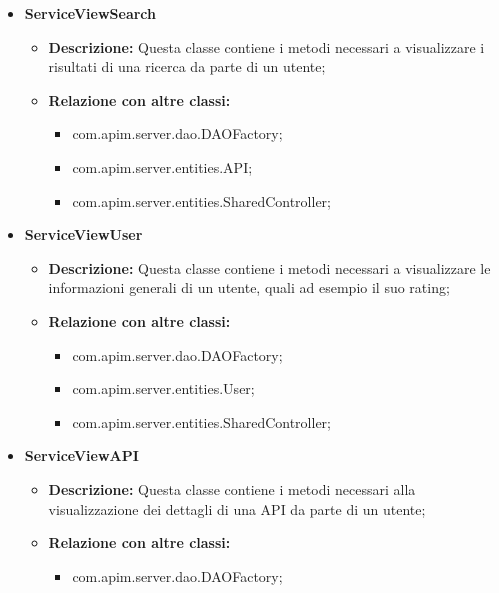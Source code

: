 {{{{\begin{itemize}
\begin{itemize}
\begin{itemize}
              \item com.apim.server.entities.SharedController;
            \end{itemize}
          \end{itemize}
          \item \textbf{ServiceViewSearch}
          \begin{itemize}
            \item \textbf{Descrizione:} Questa classe contiene i metodi necessari a visualizzare i risultati di una ricerca da parte di un utente;
            \item \textbf{Relazione con altre classi:}
            \begin{itemize}
              \item com.apim.server.dao.DAOFactory;
              \item com.apim.server.entities.API;
              \item com.apim.server.entities.SharedController;
            \end{itemize}
          \end{itemize}
          \item \textbf{ServiceViewUser}
          \begin{itemize}
            \item \textbf{Descrizione:} Questa classe contiene i metodi necessari a visualizzare le informazioni generali di un utente, quali ad esempio il suo rating;
            \item \textbf{Relazione con altre classi:}
            \begin{itemize}
              \item com.apim.server.dao.DAOFactory;
              \item com.apim.server.entities.User;
              \item com.apim.server.entities.SharedController;
            \end{itemize}
          \end{itemize}
          \item \textbf{ServiceViewAPI}
          \begin{itemize}
            \item \textbf{Descrizione:} Questa classe contiene i metodi necessari alla visualizzazione dei dettagli di una API da parte di un utente;
            \item \textbf{Relazione con altre classi:}
            \begin{itemize}
              \item com.apim.server.dao.DAOFactory;

\end{itemize}
\end{itemize}
\end{itemize}}}}}
